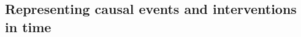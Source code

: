 \documentclass{cambridge7A}%
\begin{document}

\subsection{Representing causal events and interventions in time}
\end{document}
